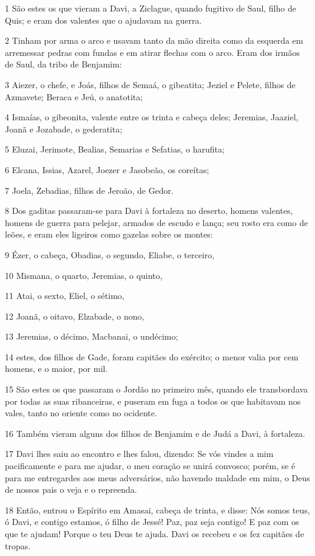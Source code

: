\par 1 São estes os que vieram a Davi, a Ziclague, quando fugitivo de Saul, filho de Quis; e eram dos valentes que o ajudavam na guerra.
\par 2 Tinham por arma o arco e usavam tanto da mão direita como da esquerda em arremessar pedras com fundas e em atirar flechas com o arco. Eram dos irmãos de Saul, da tribo de Benjamim:
\par 3 Aiezer, o chefe, e Joás, filhos de Semaá, o gibeatita; Jeziel e Pelete, filhos de Azmavete; Beraca e Jeú, o anatotita;
\par 4 Ismaías, o gibeonita, valente entre os trinta e cabeça deles; Jeremias, Jaaziel, Joanã e Jozabade, o gederatita;
\par 5 Eluzai, Jerimote, Bealias, Semarias e Sefatias, o harufita;
\par 6 Elcana, Issias, Azarel, Joezer e Jasobeão, os coreítas;
\par 7 Joela, Zebadias, filhos de Jeroão, de Gedor.
\par 8 Dos gaditas passaram-se para Davi à fortaleza no deserto, homens valentes, homens de guerra para pelejar, armados de escudo e lança; seu rosto era como de leões, e eram eles ligeiros como gazelas sobre os montes:
\par 9 Ézer, o cabeça, Obadias, o segundo, Eliabe, o terceiro,
\par 10 Mismana, o quarto, Jeremias, o quinto,
\par 11 Atai, o sexto, Eliel, o sétimo,
\par 12 Joanã, o oitavo, Elzabade, o nono,
\par 13 Jeremias, o décimo, Macbanai, o undécimo;
\par 14 estes, dos filhos de Gade, foram capitães do exército; o menor valia por cem homens, e o maior, por mil.
\par 15 São estes os que passaram o Jordão no primeiro mês, quando ele transbordava por todas as suas ribanceiras, e puseram em fuga a todos os que habitavam nos vales, tanto no oriente como no ocidente.
\par 16 Também vieram alguns dos filhos de Benjamim e de Judá a Davi, à fortaleza.
\par 17 Davi lhes saiu ao encontro e lhes falou, dizendo: Se vós vindes a mim pacificamente e para me ajudar, o meu coração se unirá convosco; porém, se é para me entregardes aos meus adversários, não havendo maldade em mim, o Deus de nossos pais o veja e o repreenda.
\par 18 Então, entrou o Espírito em Amasai, cabeça de trinta, e disse: Nós somos teus, ó Davi, e contigo estamos, ó filho de Jessé! Paz, paz seja contigo! E paz com os que te ajudam! Porque o teu Deus te ajuda. Davi os recebeu e os fez capitães de tropas.
